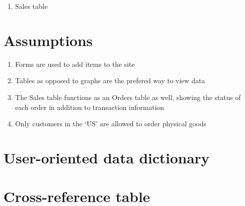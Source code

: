 \documentclass[11pt, a4paper]{report}
\begin{document}
\begin{enumerate}
\item Sales table
 
\end{enumerate}

\clearpage
\section{Assumptions}
\begin{enumerate}
\item Forms are used to add items to the site
\item Tables as opposed to graphs are the prefered way to view data
\item The Sales table functions as an Orders table as well, showing the status of each order in addition to transaction information
\item Only customers in the ‘US’ are allowed to order physical goods
\end{enumerate}

\clearpage
\section{User-oriented data dictionary}



\clearpage
\section{Cross-reference table}
\end{document}
